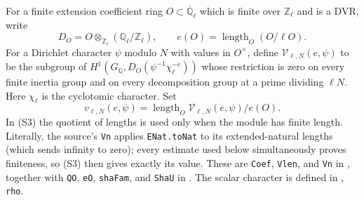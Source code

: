 For a finite extension coefficient ring $O\subset\overline{\mathbb Q}_\ell$
which is finite over $\mathbb Z_\ell$ and is a DVR, write
\[
 D_O=O\otimes_{\mathbb Z_\ell}(\mathbb Q_\ell/\mathbb Z_\ell),
 \qquad e(O)=\operatorname{length}_O(O/\ell O).
 \tag{S2}
\]
For a Dirichlet character $\psi$ modulo $N$ with values in $O^\times$, define
$\mathcal V_{\ell,N}(e,\psi)$ to be the subgroup of
$H^1(G_{\mathbb Q},D_O(\psi^{-1}\chi_\ell^{-e}))$
whose restriction is zero on every finite inertia group and on every
decomposition group at a prime dividing $\ell N$. Here $\chi_\ell$ is the
cyclotomic character. Set
\[
 v_{\ell,N}(e,\psi)
 =\operatorname{length}_O\mathcal V_{\ell,N}(e,\psi)/e(O).
 \tag{S3}
\]
In (S3) the quotient of lengths is used only when the module has finite
length. Literally, the source's \texttt{Vn} applies
\texttt{ENat.toNat} to its extended-natural lengths (which sends
infinity to zero); every estimate used below simultaneously proves
finiteness, so (S3) then gives exactly its value. These are
\texttt{Coef}, \texttt{Vlen}, and \texttt{Vn} in
, together
with \texttt{QO}, \texttt{eO}, \texttt{shaFam}, and \texttt{ShaU} in
.
The scalar character is defined in
, \texttt{rho}.

